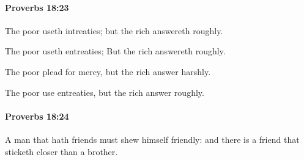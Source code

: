 		\paragraph{Proverbs 18:23} %
			\label{PROVERBS-18-23}

			The poor useth intreaties; but the rich answereth roughly.

			\begin{versebox}
					\item[BHS] 
					\item[ASV] The poor useth entreaties; But the rich answereth roughly.
					\item[NIV] The poor plead for mercy, but the rich answer harshly.
					\item[NRSV] The poor use entreaties, but the rich answer roughly.
			\end{versebox}

		\paragraph{Proverbs 18:24} %
			\label{PROVERBS-18-24}

			A man that hath friends must shew himself friendly: and there is a friend that sticketh closer than a brother.

